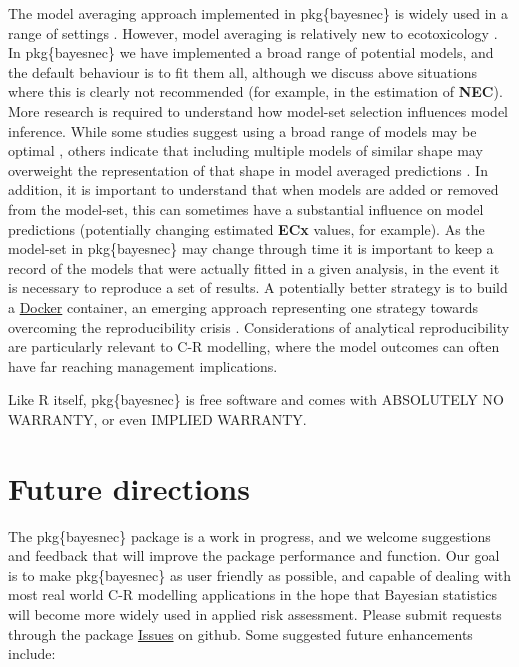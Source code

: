 \documentclass[
]{jss}
\begin{document}
The model averaging approach implemented in pkg\{bayesnec\} is widely
used in a range of settings \citep[in ecology for example, see][ for a
thorough review]{Dormann2018}. However, model averaging is relatively
new to ecotoxicology \citep[but see, for
example,][]{Shao2014, Thorley2018, fox2020, Wheeler2009}. In
pkg\{bayesnec\} we have implemented a broad range of potential models,
and the default behaviour is to fit them all, although we discuss above
situations where this is clearly not recommended (for example, in the
estimation of \textbf{NEC}). More research is required to understand how
model-set selection influences model inference. While some studies
suggest using a broad range of models may be optimal
\citep{Wheeler2009}, others indicate that including multiple models of
similar shape may overweight the representation of that shape in model
averaged predictions \citep{fox2020}. In addition, it is important to
understand that when models are added or removed from the model-set,
this can sometimes have a substantial influence on model predictions
(potentially changing estimated \textbf{ECx} values, for example). As
the model-set in pkg\{bayesnec\} may change through time it is important
to keep a record of the models that were actually fitted in a given
analysis, in the event it is necessary to reproduce a set of results. A
potentially better strategy is to build a
\href{https://docs.docker.com/get-docker/}{Docker} container, an
emerging approach representing one strategy towards overcoming the
reproducibility crisis \citep{Baker2016}. Considerations of analytical
reproducibility are particularly relevant to C-R modelling, where the
model outcomes can often have far reaching management implications.

Like R itself, pkg\{bayesnec\} is free software and comes with
ABSOLUTELY NO WARRANTY, or even IMPLIED WARRANTY.

\hypertarget{future-directions}{%
\section{Future directions}\label{future-directions}}

The pkg\{bayesnec\} package is a work in progress, and we welcome
suggestions and feedback that will improve the package performance and
function. Our goal is to make pkg\{bayesnec\} as user friendly as
possible, and capable of dealing with most real world C-R modelling
applications in the hope that Bayesian statistics will become more
widely used in applied risk assessment. Please submit requests through
the package \href{https://github.com/open-AIMS/bayesnec/issues}{Issues}
on github. Some suggested future enhancements include:
\end{document}

